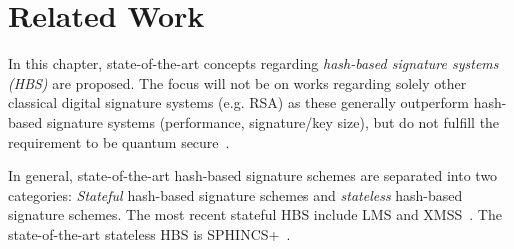 \chapter{Related Work}
\label{cha:stateOfTheArt}

In this chapter, state-of-the-art concepts regarding \textit{hash-based signature systems (HBS)} are proposed. The focus will not be on works regarding solely other classical digital signature systems (e.g. RSA) as these generally outperform hash-based signature systems (performance, signature/key size), but do not fulfill the requirement to be quantum secure~\cite{RSA_pq-attack_examples_2018,comparison_performance_RSA_ECDSA_Merkle_WOTS_2021}.

In general, state-of-the-art hash-based signature schemes are separated into two categories: \textit{Stateful} hash-based signature schemes and \textit{stateless} hash-based signature schemes. The most recent stateful HBS include LMS and XMSS~\cite{stateful_hashbased_sign_schemes_NIST_2020}. The state-of-the-art stateless HBS is SPHINCS+~\cite{tweakable_basispaper_sphincs_2019}. %








